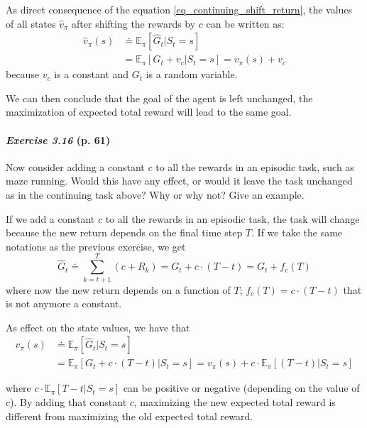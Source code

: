 \documentclass[10pt,a4paper]{article}
\begin{document}
As direct consequence of the equation \ref{eq_continuing_shift_return}, the values of all states $\hat{v}_\pi$ after shifting the rewards by $c$ can be written as:
\begin{equation}
\begin{split}
\hat{v}_\pi(s) &\doteq \mathbb{E}_\pi[\hat{G}_t \lvert S_t = s]\\
&= \mathbb{E}_\pi[ G_t + v_c \lvert S_t = s] = v_\pi(s) + v_c
\end{split}
\end{equation}
because $v_c$ is a constant and $G_t$ is a random variable.

We can then conclude that the goal of the agent is left unchanged, the maximization of expected total reward will lead to the same goal.

\paragraph{\textit{Exercise 3.16} (p. 61)} Now consider adding a constant $c$ to all the rewards in an episodic task, such as maze running. Would this have any effect, or would it leave the task unchanged as in the continuing task above? Why or why not? Give an example.

\bigskip
If we add a constant $c$ to all the rewards in an episodic task, the task will change because the new return depends on the final time step $T$. If we take the same notations as the previous exercise, we get
\begin{equation}\label{eq_episodic_shift_return}
\hat{G}_t \doteq \sum_{k=t+1}^T (c + R_k) = G_t + c \cdot (T - t) = G_t + f_c(T)
\end{equation}
where now the new return depends on a function of $T$; $f_c(T) = c \cdot (T - t)$ that is not anymore a constant.

As effect on the state values, we have that
\begin{equation}\label{eq_episodic_shift_return_state_values}
\begin{split}
\hat{v}_\pi(s) &\doteq \mathbb{E}_\pi[\hat{G}_t \lvert S_t = s]\\
&= \mathbb{E}_\pi[ G_t + c \cdot (T - t) \lvert S_t = s] = v_\pi(s) + c \cdot \mathbb{E}_\pi[(T - t) \lvert S_t = s]
\end{split}
\end{equation}

where $c \cdot \mathbb{E}_\pi[T - t \lvert S_t = s]$ can be positive or negative (depending on the value of $c$). By adding that constant $c$, maximizing the new expected total reward is different from maximizing the old expected total reward.
\end{document}

